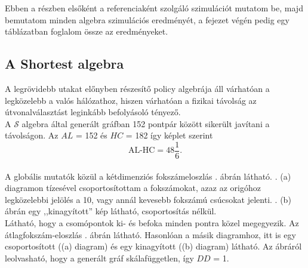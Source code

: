   Ebben a részben elsőként a referenciaként szolgáló szimulációt mutatom be, majd bemutatom minden algebra szimulációs eredményét, a fejezet végén pedig egy táblázatban foglalom össze az eredményeket.

  \subsection{A Shortest algebra}
  A legrövidebb utakat előnyben részesítő policy algebrája áll várhatóan a legközelebb a valós hálózathoz, hiszen várhatóan a fizikai távolság az útvonalválasztást leginkább befolyásoló tényező.\\

  A $\mathcal{S}$ algebra által generált gráfban 152 pontpár között sikerült javítani a távolságon. Az $AL$ = 152 és $HC$ = 182 így  képlet szerint $$\text{AL-HC} = 48 \frac{1}{6}.$$\\

  A globális mutatók közül a kétdimenziós fokszámeloszlás . ábrán látható. . (a) diagramon tízesével csoportosítottam a fokszámokat, azaz az origóhoz legközelebbi jelölés a 10, vagy annál kevesebb fokszámú csúcsokat jelenti. . (b) ábrán egy ,,kinagyított'' kép látható, csoportosítás nélkül.
  \\

  Látható, hogy a csomópontok ki- és befoka minden pontra közel megegyezik. Az átlagfokszám-eloszlás . ábrán látható. Hasonlóan a másik diagramhoz, itt is egy csoportosított ((a) diagram) és egy kinagyított ((b) diagram) látható. Az ábráról leolvasható, hogy a generált gráf skálafüggetlen, így $DD$ = 1.

